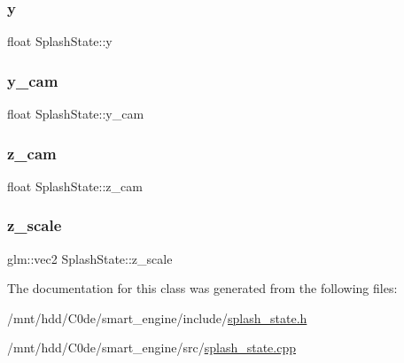 \mbox{\label{classSplashState_a4477fcbed7b631aaf135359a09bb0b3c}} 
\subsubsection{\texorpdfstring{y}{y}}
{\footnotesize\ttfamily float Splash\+State\+::y\hspace{0.3cm}{\ttfamily [private]}}

\mbox{\label{classSplashState_adce1ee0219be0b1045a578c4cae88b3b}} 
\subsubsection{\texorpdfstring{y\+\_\+cam}{y\_cam}}
{\footnotesize\ttfamily float Splash\+State\+::y\+\_\+cam\hspace{0.3cm}{\ttfamily [private]}}

\mbox{\label{classSplashState_a4c2362acca2844d0cbcdc2fc958d68a6}} 
\subsubsection{\texorpdfstring{z\+\_\+cam}{z\_cam}}
{\footnotesize\ttfamily float Splash\+State\+::z\+\_\+cam\hspace{0.3cm}{\ttfamily [private]}}

\mbox{\label{classSplashState_aa80fb9876f76790eb989071b213c967f}} 
\subsubsection{\texorpdfstring{z\+\_\+scale}{z\_scale}}
{\footnotesize\ttfamily glm\+::vec2 Splash\+State\+::z\+\_\+scale\hspace{0.3cm}{\ttfamily [private]}}



The documentation for this class was generated from the following files\+:\begin{DoxyCompactItemize}
\item 
/mnt/hdd/\+C0de/smart\+\_\+engine/include/\hyperlink{splash__state_8h}{splash\+\_\+state.\+h}\item 
/mnt/hdd/\+C0de/smart\+\_\+engine/src/\hyperlink{splash__state_8cpp}{splash\+\_\+state.\+cpp}\end{DoxyCompactItemize}
